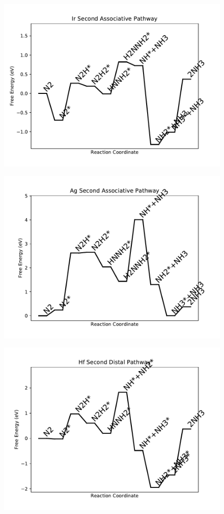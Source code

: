 \begin{figure}
\centering
\includegraphics[width=0.8\linewidth]{data/plots/Ir_associative_2.pdf}
\end{figure}

\begin{figure}
\centering
\includegraphics[width=0.8\linewidth]{data/plots/Ag_associative_2.pdf}
\end{figure}

\begin{figure}
\centering
\includegraphics[width=0.8\linewidth]{data/plots/Hf_distal_2.pdf}
\end{figure}

